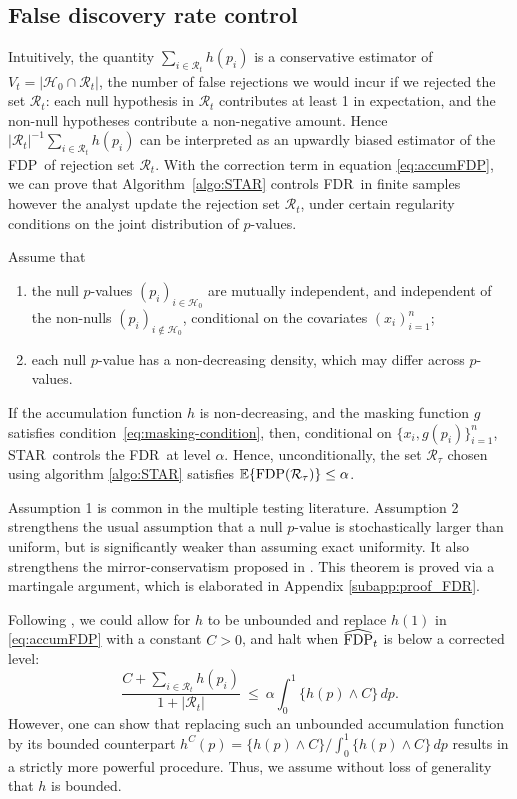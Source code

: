 \documentclass{biometrika}
\newcommand{\cH}{\mathcal{H}}
\newcommand{\cR}{\mathcal{R}}
\newcommand{\textFDP}{FDP}
\newcommand{\textFDR}{FDR}
\renewcommand{\star}{STAR}
\newcommand{\hFDP}{\widehat{\textnormal{FDP}}}
\newcommand{\FDP}{\textnormal{FDP}}
\newcommand{\E}{\mathbb{E}}
\newcommand{\1}{\mathbf{1}}
\begin{document}
\subsection{False discovery rate control}

Intuitively, the quantity $\sum_{i\in\cR_t} h(p_i)$ is a conservative estimator of $V_t = |\cH_0 \cap \cR_t|$, the number of false rejections we would incur if we rejected the set $\cR_t$: each null hypothesis in $\cR_t$ contributes at least 1 in expectation, and the non-null hypotheses contribute a non-negative amount. Hence $|\cR_t|^{-1}\sum_{i\in\cR_t}h(p_i)$ can be interpreted as an upwardly biased estimator of the \textFDP ~of rejection set $\cR_t$. With the correction term in equation \eqref{eq:accumFDP}, we can prove that Algorithm~\ref{algo:STAR} controls \textFDR ~in finite samples however the analyst update the rejection set $\cR_{t}$, under certain regularity conditions on the joint distribution of $p$-values.

\begin{theorem}\label{thm:main}
Assume that 
\begin{enumerate}[\textbf{A}1]
\item the null $p$-values $(p_i)_{i\in \cH_0}$ are mutually independent, and independent of the non-nulls $(p_i)_{i\notin \cH_0}$, conditional on the covariates $(x_i)_{i=1}^n$;
\item each null $p$-value has a non-decreasing density, which may differ across $p$-values.
\end{enumerate}
If the accumulation function $h$ is non-decreasing, and the masking function $g$ satisfies condition~\eqref{eq:masking-condition}, then, conditional on $\{x_i, g(p_i)\}_{i=1}^n$, \star ~controls the \textFDR ~at level $\alpha$. Hence, unconditionally, the set $\cR_\tau$ chosen using algorithm \ref{algo:STAR} satisfies $\E\{\FDP(\cR_\tau)\} \leq \alpha$.
\end{theorem}

Assumption 1 is common in the multiple testing literature. Assumption 2 strengthens the usual assumption that a null $p$-value is stochastically larger than uniform, but is significantly weaker than assuming exact uniformity. It also strengthens the mirror-conservatism proposed in \citep{lei2018adapt}. This theorem is proved via a martingale argument, which is elaborated in Appendix \ref{subapp:proof_FDR}.

\begin{remark}\label{rem:bounded-h}
  Following \citet{li2016accumulation}, we could allow for $h$ to be unbounded and replace $h(1)$ in \eqref{eq:accumFDP} with a constant $C>0$, and halt when $\hFDP_t$ is below a corrected level:
\[
\frac{C + \sum_{i\in\cR_t}h(p_i)}{1 + |\cR_t|} ~\leq~ \alpha\int_0^1 \{h(p) \wedge C\}\,dp.
\]
However, one can show that replacing such an unbounded accumulation function by its bounded counterpart $h^C(p) = \{h(p) \wedge C\}/\int_0^1 \{h(p) \wedge C\}\,dp$ results in a strictly more powerful procedure. Thus, we assume without loss of generality that $h$ is bounded.
\end{remark}
\end{document}
